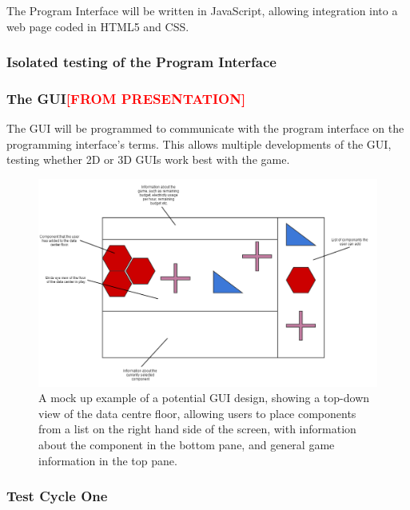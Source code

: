 The Program Interface will be written in JavaScript, allowing integration into a web page coded in HTML5 and CSS.

\subsubsection{Isolated testing of the Program Interface}

\subsubsection{The GUI\textcolor{red}{[FROM PRESENTATION]}}
\label{sec:Methodology:TechnicalOverview:TheGUI}
The GUI will be programmed to communicate with the program interface on the programming interface's terms. This allows multiple developments of the GUI, testing whether 2D or 3D GUIs work best with the game.

\begin{figure}[H]
\centering
\includegraphics[width=7.25in]{Resources//GUI Mock up.png}
\caption{A mock up example of a potential GUI design, showing a top-down view of the \gls{data centre} floor, allowing users to place components from a list on the right hand side of the screen, with information about the component in the bottom pane, and general game information in the top pane.}
\label{fig:GUIMockUp}
\end{figure}

\subsubsection{Test Cycle One}
\label{sec:DevelopmentOfTheComponentDatabaseAndTheLogicEngineApplicationComponents:TestingOfTheComponentDatabaseAndTheLogicEngineViaTheTestInterface:TestCycleOne}

